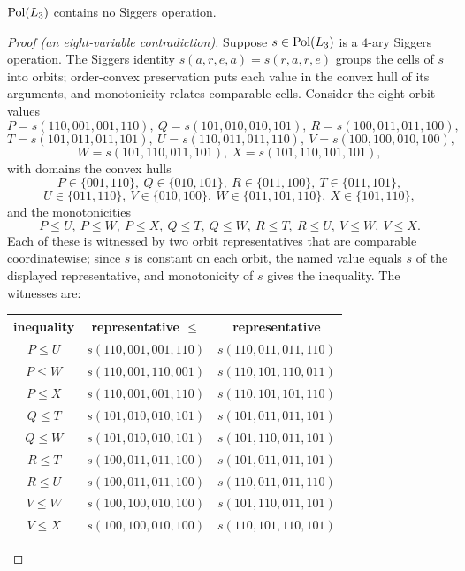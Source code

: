 \begin{prop}\label{prop:nosiggers}
  $\operatorname{Pol}(L_3)$ contains no Siggers operation.
\end{prop}
\begin{proof}[Proof (an eight-variable contradiction)]
  Suppose $s\in\operatorname{Pol}(L_3)$ is a $4$-ary Siggers operation.  The Siggers
  identity $s(a,r,e,a)=s(r,a,r,e)$ groups the cells of $s$ into orbits;
  order-convex preservation puts each value in the convex hull of its
  arguments, and monotonicity relates comparable cells.  Consider the
  eight orbit-values
  \[
    P=s(110,001,001,110),\ Q=s(101,010,010,101),\ R=s(100,011,011,100),
  \]
  \[
    T=s(101,011,011,101),\ U=s(110,011,011,110),\ V=s(100,100,010,100),
  \]
  \[
    W=s(101,110,011,101),\ X=s(101,110,101,101),
  \]
  with domains the convex hulls
  \[
    P\in\{001,110\},\ Q\in\{010,101\},\ R\in\{011,100\},\ T\in\{011,101\},
  \]
  \[
    U\in\{011,110\},\ V\in\{010,100\},\ W\in\{011,101,110\},\ X\in\{101,110\},
  \]
  and the monotonicities
  \[
    P\le U,\ P\le W,\ P\le X,\ Q\le T,\ Q\le W,\ R\le T,\ R\le U,\ V\le W,\ V\le X.
  \]
  Each of these is witnessed by two orbit representatives that are
  comparable coordinatewise; since $s$ is constant on each orbit, the
  named value equals $s$ of the displayed representative, and
  monotonicity of $s$ gives the inequality.  The witnesses are:
  \begin{center}\small
  \renewcommand{\arraystretch}{1.05}
  \begin{tabular}{ccc}
  \hline
  inequality & representative $\le$ & representative\\
  \hline
  $P\le U$ & $s(110,001,001,110)$ & $s(110,011,011,110)$\\
  $P\le W$ & $s(110,001,110,001)$ & $s(110,101,110,011)$\\
  $P\le X$ & $s(110,001,001,110)$ & $s(110,101,101,110)$\\
  $Q\le T$ & $s(101,010,010,101)$ & $s(101,011,011,101)$\\
  $Q\le W$ & $s(101,010,010,101)$ & $s(101,110,011,101)$\\
  $R\le T$ & $s(100,011,011,100)$ & $s(101,011,011,101)$\\
  $R\le U$ & $s(100,011,011,100)$ & $s(110,011,011,110)$\\
  $V\le W$ & $s(100,100,010,100)$ & $s(101,110,011,101)$\\
  $V\le X$ & $s(100,100,010,100)$ & $s(110,101,110,101)$\\
  \hline
  \end{tabular}

\end{center}
\end{proof}
